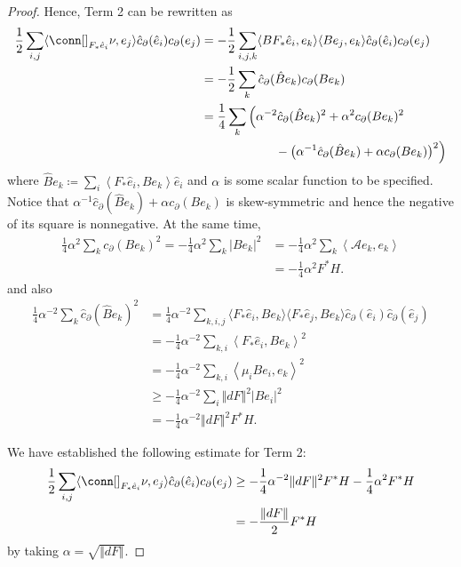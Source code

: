 \documentclass[12pt, reqno]{amsart}
\theoremstyle{plain} %
\theoremstyle{definition}
\theoremstyle{remark}
\numberwithin{equation}{section}
\newcommand{\dom}[1]{\hat{#1}}
\newcommand{\onorm}[1]{\Vert #1 \Vert}
\newcommand{\pnorm}[1]{| #1 |}
\newcommand{\inner}[1]{\langle #1 \rangle}
\begin{document}
\begin{proof}
    Hence, Term 2 can be rewritten as
    \begin{align*}
        \frac{1}{2} \sum_{i, j} \inner{\conn[]_{F_*\dom{e}_i} \nu, e_j} \dom{c}_\partial(\dom{e}_i) c_\partial(e_j) &= -\frac{1}{2}\sum_{i,j,k} \inner{BF_*\dom{e}_i, e_k} \inner{Be_j,e_k} \dom{c}_\partial(\dom{e}_i) c_\partial(e_j) \\
        &= -\frac{1}{2} \sum_k \dom{c}_\partial(\dom{B} e_k) c_\partial(B e_k) \\
        &= \frac{1}{4} \sum_k \Big(\alpha^{-2} \dom{c}_\partial(\dom{B}e_k)^2 + \alpha^2 c_\partial(Be_k)^2 \\
        &\qquad\qquad\qquad -\big(\alpha^{-1} \dom{c}_\partial(\dom{B}e_k) + \alpha c_\partial(Be_k)\big)^2\Big)
    \end{align*}
    where \(\dom{B}e_k \coloneqq \sum_i \left< F_*\dom{e}_i, Be_k \right> \dom{e}_i\) and \(\alpha\) is some scalar function to be specified.
    Notice that \(\alpha^{-1} \dom{c}_\partial(\dom{B} e_k) + \alpha c_\partial(B e_k)\) is skew-symmetric and hence the negative of its square is nonnegative.
    At the same time,
    \begin{align*}
        \frac{1}{4} \alpha^2 \sum_k c_\partial(Be_k)^2 = -\frac{1}{4} \alpha^2 \sum_k \pnorm{B e_k}^2 &= -\frac{1}{4} \alpha^2 \sum_k \left<\mathcal{A}e_k, e_k\right> \\
        &= -\frac{1}{4} \alpha^2 F^*H.
    \end{align*}
    and also
    \begin{align*}
        \frac{1}{4} \alpha^{-2} \sum_k \dom{c}_\partial(\dom{B} e_k)^2 &=  \frac{1}{4} \alpha^{-2} \sum_{k,i,j} \inner{F_*\dom{e}_i, Be_k} \inner{F_*\dom{e}_j, Be_k} \dom{c}_\partial(\dom{e}_i) \dom{c}_\partial(\dom{e}_j)\\
        &= -\frac{1}{4} \alpha^{-2} \sum_{k,i} \left<F_*\dom{e}_i, Be_k\right>^2 \\
        &= -\frac{1}{4} \alpha^{-2} \sum_{k,i} \left<\mu_i Be_i, e_k\right>^2 \\
        &\geq -\frac{1}{4} \alpha^{-2} \sum_i \onorm{dF}^2 \pnorm{B e_i}^2 \\
        &= -\frac{1}{4} \alpha^{-2} \onorm{dF}^2 F^*H.
    \end{align*}

    We have established the following estimate for Term 2:
    \begin{align*}
        \frac{1}{2} \sum_{i, j} \inner{\conn[]_{F_*\dom{e}_i} \nu, e_j} \dom{c}_\partial(\dom{e}_i) c_\partial(e_j) &\geq -\frac{1}{4} \alpha^{-2} \onorm{dF}^2 F^*H - \frac{1}{4} \alpha^2 F^*H \\
        &= -\frac{\onorm{dF}}{2} F^*H
    \end{align*}
    by taking \(\alpha = \sqrt{\onorm{dF}}\).


\end{proof}
\end{document}
